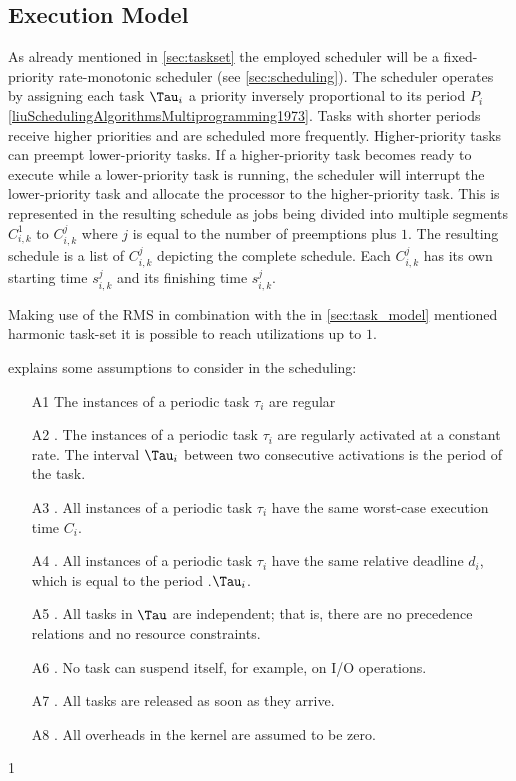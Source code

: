 \subsection{Execution Model}\label{sec:execution_model}
As already mentioned in \cref{sec:taskset} the employed scheduler will be a fixed-priority rate-monotonic scheduler (see \cref{sec:scheduling}).
The scheduler operates by assigning each task $\Tau_i$ a priority inversely proportional to its period $P_i$\ref{liuSchedulingAlgorithmsMultiprogramming1973}.
Tasks with shorter periods receive higher priorities and are scheduled more frequently.
Higher-priority tasks can preempt lower-priority tasks.
If a higher-priority task becomes ready to execute while a lower-priority task is running, the scheduler will interrupt the lower-priority task and allocate the processor to the higher-priority task.
This is represented in the resulting schedule as jobs being divided into multiple segments $C_{i,k}^1$ to $C_{i,k}^j$ where $j$ is equal to the number of preemptions plus $1$.
The resulting schedule is a list of $C_{i,k}^j$ depicting the complete schedule.
Each $C_{i,k}^j$ has its own starting time $s_{i,k}^j$ and its finishing time $s_{i,k}^j$.

Making use of the \ac{RMS} in combination with the in \cref{sec:task_model} mentioned harmonic task-set it is possible to reach utilizations up to $1$\cite{liuSchedulingAlgorithmsMultiprogramming1973}.

\textcite[p. 70f]{buttazzoHardRealTimeComputing2024} explains some assumptions to consider in the scheduling:
\begin{enumerate}
	\item[A1] The instances of a periodic task $\tau_i$ are regular
	\item[A2]. The instances of a periodic task $\tau_i$ are regularly activated at a constant rate. The interval $\Tau_i$ between two consecutive activations is the period of the task. 
	\item[A3]. All instances of a periodic task $\tau_i$ have the same worst-case execution time $C_i$.
	\item[A4]. All instances of a periodic task $\tau_i$ have the same relative deadline $d_i$, which is equal to the period .$\Tau_i$. 
	\item[A5]. All tasks in $\Tau$ are independent; that is, there are no precedence relations and no resource constraints.
	\item[A6]. No task can suspend itself, for example, on I/O operations. 
	\item[A7]. All tasks are released as soon as they arrive. 
	\item[A8]. All overheads in the kernel are assumed to be zero. 
\end{enumerate}
1

